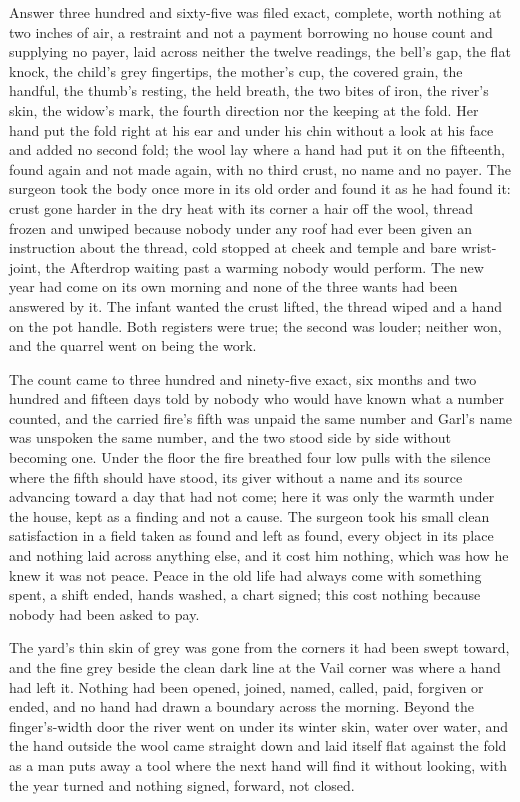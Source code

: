 Answer three hundred and sixty-five was filed exact, complete, worth nothing at two inches of air, a restraint and not a payment borrowing no house count and supplying no payer, laid across neither the twelve readings, the bell's gap, the flat knock, the child's grey fingertips, the mother's cup, the covered grain, the handful, the thumb's resting, the held breath, the two bites of iron, the river's skin, the widow's mark, the fourth direction nor the keeping at the fold. Her hand put the fold right at his ear and under his chin without a look at his face and added no second fold; the wool lay where a hand had put it on the fifteenth, found again and not made again, with no third crust, no name and no payer. The surgeon took the body once more in its old order and found it as he had found it: crust gone harder in the dry heat with its corner a hair off the wool, thread frozen and unwiped because nobody under any roof had ever been given an instruction about the thread, cold stopped at cheek and temple and bare wrist-joint, the Afterdrop waiting past a warming nobody would perform. The new year had come on its own morning and none of the three wants had been answered by it. The infant wanted the crust lifted, the thread wiped and a hand on the pot handle. Both registers were true; the second was louder; neither won, and the quarrel went on being the work.

The count came to three hundred and ninety-five exact, six months and two hundred and fifteen days told by nobody who would have known what a number counted, and the carried fire's fifth was unpaid the same number and Garl's name was unspoken the same number, and the two stood side by side without becoming one. Under the floor the fire breathed four low pulls with the silence where the fifth should have stood, its giver without a name and its source advancing toward a day that had not come; here it was only the warmth under the house, kept as a finding and not a cause. The surgeon took his small clean satisfaction in a field taken as found and left as found, every object in its place and nothing laid across anything else, and it cost him nothing, which was how he knew it was not peace. Peace in the old life had always come with something spent, a shift ended, hands washed, a chart signed; this cost nothing because nobody had been asked to pay.

The yard's thin skin of grey was gone from the corners it had been swept toward, and the fine grey beside the clean dark line at the Vail corner was where a hand had left it. Nothing had been opened, joined, named, called, paid, forgiven or ended, and no hand had drawn a boundary across the morning. Beyond the finger's-width door the river went on under its winter skin, water over water, and the hand outside the wool came straight down and laid itself flat against the fold as a man puts away a tool where the next hand will find it without looking, with the year turned and nothing signed, forward, not closed.

